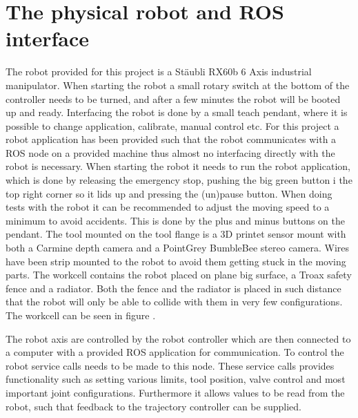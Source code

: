 

\section{The physical robot and ROS interface}
\label{sec:robot_physical}
The robot provided for this project is a Stäubli RX60b 6 Axis industrial manipulator. When starting the robot a small rotary switch at the bottom of the controller needs to be turned, and after a few minutes the robot will be booted up and ready. Interfacing the robot is done by a small teach pendant, where it is possible to change application, calibrate, manual control etc. For this project a robot application has been provided such that the robot communicates with a ROS node on a provided machine thus almost no interfacing directly with the robot is necessary. When starting the robot it needs to run the robot application, which is done by releasing the emergency stop, pushing the big green button i the top right corner so it lids up and pressing the (un)pause button. When doing tests with the robot it can be recommended to adjust the moving speed to a minimum to avoid accidents. This is done by the plus and minus buttons on the pendant.
The tool mounted on the tool flange is a 3D printet sensor mount with both a Carmine depth camera and a PointGrey BumbleBee stereo camera. Wires have been strip mounted to the robot to avoid them getting stuck in the moving parts. 
The workcell contains the robot placed on plane big surface, a Troax safety fence and a radiator. Both the fence and the radiator is placed in such distance that the robot will only be able to collide with them in very few configurations. The workcell can be seen in figure .


The robot axis are controlled by the robot controller which are then connected to a computer with a provided ROS application for communication. To control the robot service calls needs to be made to this node. These service calls provides functionality such as setting various limits, tool position, valve control and most important joint configurations. Furthermore it allows values to be read from the robot, such that feedback to the trajectory controller can be supplied.

